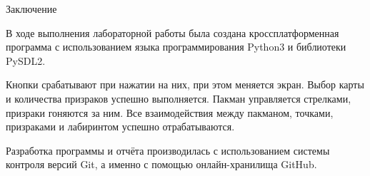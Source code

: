 \documentclass[10pt,a4paper,mathserif]{beamer}
\begin{document}
\begin{frame}{Заключение}
    \begin{block}{}
        В ходе выполнения лабораторной работы была создана кроссплатформенная программа с использованием языка программирования Python3 и библиотеки PySDL2.
    \end{block}

    \begin{block}{}
        Кнопки срабатывают при нажатии на них, при этом меняется экран. Выбор карты и количества призраков успешно выполняется. Пакман управляется стрелками, призраки гоняются за ним. Все взаимодействия между пакманом, точками, призраками и лабиринтом успешно отрабатываются.
    \end{block}

    \begin{block}{}
        Разработка программы и отчёта производилась с использованием системы контроля версий Git, а именно с помощью онлайн-хранилища GitHub.
    \end{block}
\end{frame}
\end{document}
